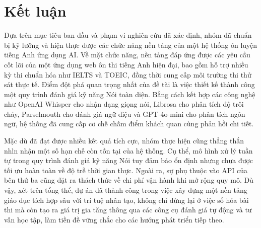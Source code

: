 \chapter{Kết luận}

Dựa trên mục tiêu ban đầu và phạm vi nghiên cứu đã xác định, nhóm đã chuẩn bị kỹ lưỡng và hiện thực được các chức năng nền tảng của một hệ thống ôn luyện tiếng Anh ứng dụng AI. Về mặt chức năng, nền tảng đáp ứng được các yêu cầu cốt lõi của một ứng dụng web ôn thi tiếng Anh hiện đại, bao gồm hỗ trợ nhiều kỳ thi chuẩn hóa như IELTS và TOEIC, đồng thời cung cấp môi trường thi thử sát thực tế. Điểm đột phá quan trọng nhất của đề tài là việc thiết kế thành công một quy trình đánh giá kỹ năng Nói toàn diện. Bằng cách kết hợp các công nghệ như OpenAI Whisper cho nhận dạng giọng nói, Librosa cho phân tích độ trôi chảy, Parselmouth cho đánh giá ngữ điệu và GPT-4o-mini cho phân tích ngôn ngữ, hệ thống đã cung cấp cơ chế chấm điểm khách quan cùng phản hồi chi tiết.

Mặc dù đã đạt được nhiều kết quả tích cực, nhóm thực hiện cũng thẳng thắn nhìn nhận một số hạn chế còn tồn tại của hệ thống. Cụ thể, mô hình xử lý tuần tự trong quy trình đánh giá kỹ năng Nói tuy đảm bảo ổn định nhưng chưa được tối ưu hoàn toàn về độ trễ thời gian thực. Ngoài ra, sự phụ thuộc vào API của bên thứ ba cũng đặt ra thách thức về chi phí vận hành khi mở rộng quy mô. Dù vậy, xét trên tổng thể, dự án đã thành công trong việc xây dựng một nền tảng giáo dục tích hợp sâu với trí tuệ nhân tạo, không chỉ dừng lại ở việc số hóa bài thi mà còn tạo ra giá trị gia tăng thông qua các công cụ đánh giá tự động và tư vấn học tập, làm tiền đề vững chắc cho các hướng phát triển tiếp theo.